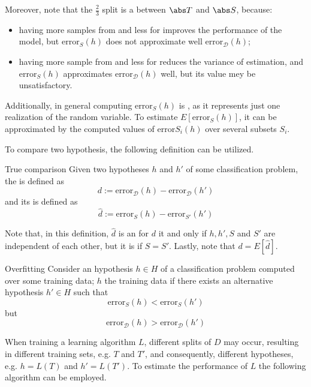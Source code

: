 \documentclass[a4paper, 12pt]{report}
\begin{document}
    Moreover, note that the $\frac{2}{3}$ split is a  between $\abs T$ and $\abs S$, because:

    \begin{itemize}
        \item having more samples from  and less for  improves the performance of the model, but $\mathrm{error}_S(h)$ does not approximate well $\mathrm{error}_\mathcal D (h)$;
        \item having more sample from  and less for  reduces the variance of estimation, and $\mathrm{error}_S(h)$ approximates $\mathrm{error}_\mathcal D (h)$ well, but its value mey be unsatisfactory.
    \end{itemize}

    Additionally, in general computing $\mathrm{error}_S(h)$ is , as it represents just one realization of the random variable. To estimate $E[\mathrm{error}_S(h)]$, it can be approximated by  the computed values of $\mathrm{error}{S_i}(h)$ over several subsets $S_i$.

    To compare two hypothesis, the following definition can be utilized.

    \begin{frameddefn}{True comparison}
        Given two hypotheses $h$ and $h'$ of some classification problem, the  is defined as $$d := \mathrm{error}_\mathcal D(h) - \mathrm{error}_\mathcal D(h')$$ and its  is defined as $$\hat d := \mathrm{error}_{S}(h) - \mathrm{error}_{S'}(h')$$
    \end{frameddefn}

    Note that, in this definition, $\hat d$ is an  for $d$ it and only if $h, h', S$ and $S'$ are independent of each other, but it is  if $S = S'$. Lastly, note that $d = E[\hat d]$.
    
    \begin{frameddefn}{Overfitting}
        Consider an hypothesis $h \in H$ of a classification problem computed over some training data; $h$  the training data if there exists an alternative hypothesis $h' \in H$ such that $$\mathrm{error}_S(h) < \mathrm{error}_S(h')$$ but $$\mathrm{error}_\mathcal D(h) > \mathrm{error}_\mathcal D(h')$$
    \end{frameddefn}

    When training a learning algorithm $L$, different splits of $D$ may occur, resulting in different training sets, e.g. $T$ and $T'$, and consequently, different hypotheses, e.g. $h= L(T)$ and $h'= L(T')$. To estimate the performance of $L$ the following algorithm can be employed.
\end{document}
